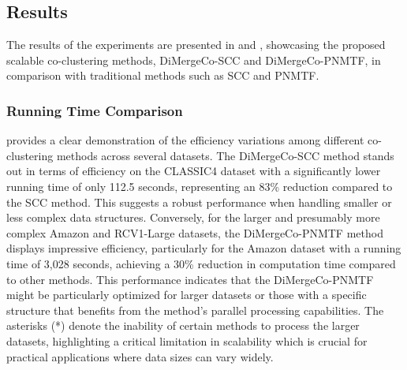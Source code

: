 \documentclass[journal]{IEEEtran}
\begin{document}
\subsection{Results}
The results of the experiments are presented in  and , showcasing the proposed scalable co-clustering methods, DiMergeCo-SCC and DiMergeCo-PNMTF, in comparison with traditional methods such as SCC and PNMTF.

\subsubsection{Running Time Comparison}
 provides a clear demonstration of the efficiency variations among different co-clustering methods across several datasets. The DiMergeCo-SCC method stands out in terms of efficiency on the CLASSIC4 dataset with a significantly lower running time of only 112.5 seconds, representing an 83\% reduction compared to the SCC method. This suggests a robust performance when handling smaller or less complex data structures. Conversely, for the larger and presumably more complex Amazon and RCV1-Large datasets, the DiMergeCo-PNMTF method displays impressive efficiency, particularly for the Amazon dataset with a running time of 3,028 seconds, achieving a 30\% reduction in computation time compared to other methods. This performance indicates that the DiMergeCo-PNMTF might be particularly optimized for larger datasets or those with a specific structure that benefits from the method's parallel processing capabilities. The asterisks (*) denote the inability of certain methods to process the larger datasets, highlighting a critical limitation in scalability which is crucial for practical applications where data sizes can vary widely.
\end{document}
